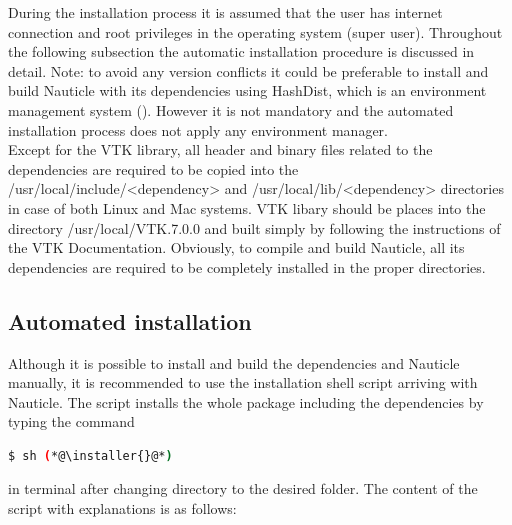 \documentclass[a4paper,12pt,openany]{book}
\newcommand{\myhref}[3][nauticlegreen_dark]{\href{#2}{\color{#1}{#3}}}%
\theoremstyle{break}
\begin{document}
During the installation process it is assumed that the user has internet connection and root privileges in the operating system (super user). Throughout the following subsection the automatic installation procedure is discussed in detail.
Note: to avoid any version conflicts it could be preferable to install and build Nauticle with its dependencies using HashDist, which is an environment management system (\myhref{https://github.com/hashdist/hashdist}{https://github.com/hashdist/ hashdist}). However it is not mandatory and the automated installation process does not apply any environment manager. \\
Except for the VTK library, all header and binary files related to the dependencies are required to be copied into the /usr/local/include/<dependency> and /usr/local/lib/<dependency> directories in case of both Linux and Mac systems. VTK libary should be places into the directory /usr/local/VTK.7.0.0 and built simply by following the instructions of the VTK Documentation. Obviously, to compile and build Nauticle, all its dependencies are required to be completely installed in the proper directories. 
\subsection{Automated installation}
Although it is possible to install and build the dependencies and Nauticle manually, it is recommended to use the installation shell script arriving with Nauticle. The script installs the whole package including the dependencies by typing the command
\begin{lstlisting}[language=bash]
  $ sh (*@\installer{}@*)
\end{lstlisting}
in terminal after changing directory to the desired folder. The content of the script with explanations is as follows:
\end{document}
